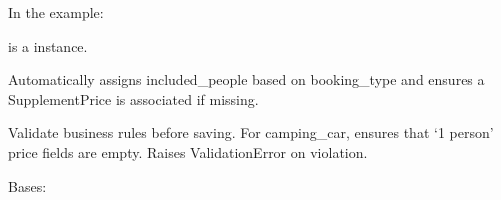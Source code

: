 \documentclass[letterpaper,10pt,english]{sphinxmanual}
\begin{document}
\begin{fulllineitems}
\begin{fulllineitems}
\sphinxAtStartPar
In the example:

\begin{sphinxVerbatim}[commandchars=\\\{\}]
       
\end{sphinxVerbatim}

\sphinxAtStartPar
{} is a  instance.

\end{fulllineitems}


\begin{fulllineitems}
\label{\detokenize{index:bookings.models.Price.save}}
\pysigstartsignatures
\pysiglinewithargsret
{}
{\sphinxparamcomma {}}
{}
\pysigstopsignatures
\sphinxAtStartPar
Automatically assigns included\_people based on booking\_type and
ensures a SupplementPrice is associated if missing.

\end{fulllineitems}


\begin{fulllineitems}
\label{\detokenize{index:bookings.models.Price.clean}}
\pysigstartsignatures
\pysiglinewithargsret
{}
{}
{}
\pysigstopsignatures
\sphinxAtStartPar
Validate business rules before saving.
For camping\_car, ensures that ‘1 person’ price fields are empty.
Raises ValidationError on violation.

\end{fulllineitems}


\begin{fulllineitems}
\label{\detokenize{index:bookings.models.Price.DoesNotExist}}
\pysigstartsignatures
\pysigline
{}
\pysigstopsignatures
\sphinxAtStartPar
Bases: 


\end{fulllineitems}
\end{fulllineitems}
\end{document}
